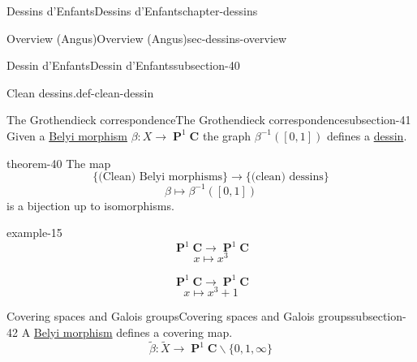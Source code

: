 \documentclass[oneside,10pt,]{book}
\numberwithin{equation}{section}
\newcommand{\inv}{^{-1}}
\newcommand{\lb}{[}
\newcommand{\rb}{]}
\newcommand{\CC}{\mathbf{C}}
\DeclareMathOperator{\PP}{\mathbf{P}}
\begin{document}
\begin{chapterptx}{Dessins d'Enfants}{}{Dessins d'Enfants}{}{}{chapter-dessins}
\begin{sectionptx}{Overview (Angus)}{}{Overview (Angus)}{}{}{sec-dessins-overview}
\begin{subsectionptx}{Dessin d'Enfants}{}{Dessin d'Enfants}{}{}{subsection-40}
\begin{definition}{Clean dessins.}{def-clean-dessin}
\end{definition}
\end{subsectionptx}
%
%
\typeout{************************************************}
\typeout{************************************************}
%
\begin{subsectionptx}{The Grothendieck correspondence}{}{The Grothendieck correspondence}{}{}{subsection-41}
\hypertarget{p-468}{}%
Given a \hyperref[def-belyi-morphism]{Belyi morphism} \(\beta\colon X \to \PP^1 \CC\) the graph \(\beta^{-1}(\lb 0,1\rb)\) defines a \hyperref[def-dessin-denfant]{dessin}.%
\begin{theorem}{}{}{theorem-40}%
\hypertarget{p-469}{}%
The map%
\begin{equation*}
\{\text{(Clean) Belyi morphisms}\} \to \{\text{(clean) dessins}\}
\end{equation*}
%
\begin{equation*}
\beta \mapsto \beta\inv([0,1])
\end{equation*}
is a bijection up to isomorphisms.%
\end{theorem}
\begin{example}{}{example-15}%
\hypertarget{p-470}{}%
%
\begin{equation*}
\PP^1 \CC\to \PP^1\CC
\end{equation*}
%
\begin{equation*}
x\mapsto x^3
\end{equation*}
%
\par
\hypertarget{p-471}{}%
%
\begin{equation*}
\PP^1 \CC\to \PP^1\CC
\end{equation*}
%
\begin{equation*}
x\mapsto x^3 + 1
\end{equation*}
%
\end{example}
\end{subsectionptx}
%
%
\typeout{************************************************}
\typeout{************************************************}
%
\begin{subsectionptx}{Covering spaces and Galois groups}{}{Covering spaces and Galois groups}{}{}{subsection-42}
\hypertarget{p-472}{}%
A \hyperref[def-belyi-morphism]{Belyi morphism} defines a covering map.%
\begin{equation*}
\tilde \beta\colon \tilde X \to \PP^1 \CC\smallsetminus \{0,1,\infty\}
\end{equation*}

\end{subsectionptx}
\end{sectionptx}
\end{chapterptx}
\end{document}
